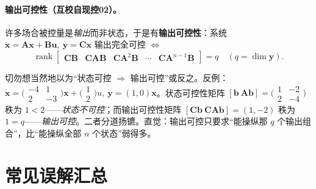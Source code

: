 \paragraph{输出可控性（互校自现控02）。}
许多场合被控量是\emph{输出}而非状态，于是有\textbf{输出可控性}\cite{zhang2017modern}：系统 $\dot{\mathbf{x}}=\mathbf{A}\mathbf{x}+\mathbf{B}\mathbf{u},\ \mathbf{y}=\mathbf{C}\mathbf{x}$ 输出完全可控 $\iff$
\begin{equation}
  \operatorname{rank}\begin{bmatrix}\mathbf{C}\mathbf{B}&\mathbf{C}\mathbf{A}\mathbf{B}&\mathbf{C}\mathbf{A}^2\mathbf{B}&\cdots&\mathbf{C}\mathbf{A}^{n-1}\mathbf{B}\end{bmatrix}=q\quad(q=\dim\mathbf{y}).
  \label{eq:co-output-ctrl}
\end{equation}

\begin{pitfall}[状态可控性与输出可控性没有必然联系]
切勿想当然地以为“状态可控 $\Rightarrow$ 输出可控”或反之\cite{zhang2017modern}。反例：$\dot{\mathbf{x}}=\big(\begin{smallmatrix}-4&1\\2&-3\end{smallmatrix}\big)\mathbf{x}+\big(\begin{smallmatrix}1\\2\end{smallmatrix}\big)u,\ \mathbf{y}=(1,0)\mathbf{x}$。状态可控性矩阵 $[\mathbf{b}\ \mathbf{A}\mathbf{b}]=\big(\begin{smallmatrix}1&-2\\2&-4\end{smallmatrix}\big)$ 秩为 $1<2$——\emph{状态不可控}；而输出可控性矩阵 $[\mathbf{C}\mathbf{b}\ \mathbf{C}\mathbf{A}\mathbf{b}]=(1,-2)$ 秩为 $1=q$——\emph{输出可控}。二者分道扬镳。直觉：输出可控只要求“能操纵那 $q$ 个输出组合”，比“能操纵全部 $n$ 个状态”弱得多。
\end{pitfall}

\section{常见误解汇总}
\label{sec:co-misconceptions}

